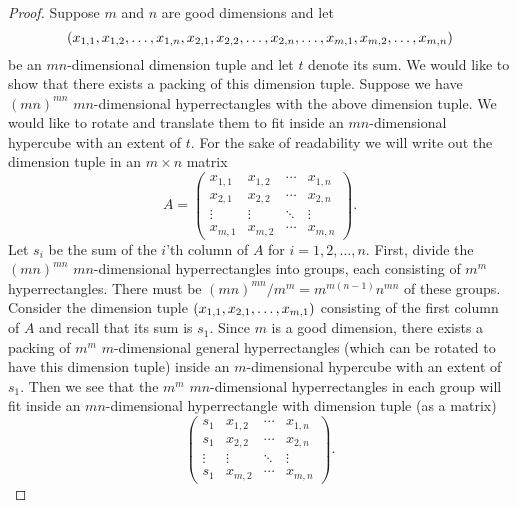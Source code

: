 \FloatBarrier
{}
\begin{proof}
Suppose $m$ and $n$ are good dimensions and let
\[
\left( 
x_{1, 1}, x_{1, 2}, \dotsc, x_{1, n},
x_{2, 1}, x_{2, 2}, \dotsc, x_{2, n},
\dotsc,
x_{m, 1}, x_{m, 2}, \dotsc, x_{m, n}
 \right)
\]
be an $mn$-dimensional dimension tuple and let $t$ denote its sum. We would like to show that there exists a packing of this dimension tuple. Suppose we have $(mn)^{mn}$ $mn$-dimensional hyperrectangles with the above dimension tuple. We would like to rotate and translate them to fit inside an $mn$-dimensional hypercube with an extent of $t$. For the sake of readability we will write out the dimension tuple in an $m \times n$ matrix
\[
A = \begin{pmatrix}
x_{1, 1} & x_{1, 2} & \cdots & x_{1, n} \\
x_{2, 1} & x_{2, 2} & \cdots & x_{2, n} \\
\vdots   & \vdots   & \ddots & \vdots   \\
x_{m, 1} & x_{m, 2} & \cdots & x_{m, n}
\end{pmatrix}.
\]
Let $s_i$ be the sum of the $i$'th column of $A$ for $i = 1, 2, \dotsc, n$. First, divide the $(mn)^{mn}$ $mn$-dimensional hyperrectangles into groups, each consisting of $m^m$ hyperrectangles. There must be $(mn)^{mn}/m^m = m^{m(n-1)}n^{mn}$ of these groups. Consider the dimension tuple $\left( x_{1, 1}, x_{2, 1}, \dotsc, x_{m, 1} \right)$ consisting of the first column of $A$ and recall that its sum is $s_1$. Since $m$ is a good dimension, there exists a packing of $m^m$ $m$-dimensional general hyperrectangles (which can be rotated to have this dimension tuple) inside an $m$-dimensional hypercube with an extent of $s_1$. Then we see that the $m^m$ $mn$-dimensional hyperrectangles in each group will fit inside an $mn$-dimensional hyperrectangle with dimension tuple (as a matrix)
\[
\begin{pmatrix}
s_1    & x_{1, 2} & \cdots & x_{1, n} \\
s_1    & x_{2, 2} & \cdots & x_{2, n} \\
\vdots & \vdots   & \ddots & \vdots   \\
s_1    & x_{m, 2} & \cdots & x_{m, n}
\end{pmatrix}.
\]

\end{proof}
